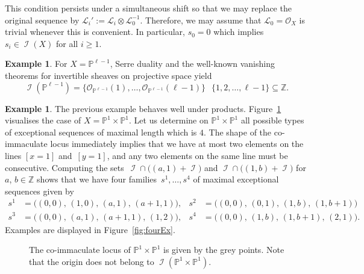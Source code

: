 \documentclass[11pt]{article}
\theoremstyle{definition}
\newtheorem{exam}[theo]{Example}
\numberwithin{equation}{section}
\newcommand{\PP}{\mathbb P}
\newcommand{\Z}{\mathbb Z}
\newcommand{\CI}{{\mathcal I}}
\newcommand{\CL}{{\mathcal L}}
\newcommand{\CO}{{\mathcal O}}
\newcommand{\entspr}{\mathop{\widehat{=}}}
\newcommand{\nImm}{\operatorname{\CI}}
\newcommand{\cl}{s}
\newcommand{\mes}{maximal exceptional sequence}
\begin{document}
This condition persists under a 
simultaneous shift so that we 
may replace the original sequence by 
$\CL_i':=\CL_i\otimes\CL_0^{-1}$. 
Therefore, we may assume that 
$\CL_0=\CO_X$ is trivial whenever this 
is convenient. In particular, $\cl_0=0$ 
which implies $\cl_i\in\nImm(X)$ for 
all $i\geq 1$.

\begin{exam}\label{ex:PnP1}
For $X=\PP^{\ell-1}$, Serre duality and 
the well-known vanishing theorems for 
invertible sheaves on projective space 
yield 
$$
\nImm(\PP^{\ell-1})=\{\CO_{\PP^{\ell-1}}(1),\ldots,
\CO_{\PP^{\ell-1}}(\ell-1)\}
\entspr\,\{1,2,\ldots,\ell-1\}\subseteq\Z.
$$
\end{exam}

\begin{exam}\label{ex:P1P1}
The previous example behaves well under 
products. Figure~\ref{fig:ImmP2P2} 
visualises the case of $X=\PP^1\times\PP^1$. 
Let us determine on $\PP^1\times\PP^1$ all 
possible types of exceptional sequences of 
maximal length which is $4$. The shape of 
the {co-immaculate} locus immediately implies 
that we have at most two elements on the 
lines $[x=1]$ and~$[y=1]$, and any two 
elements on the same line must be 
consecutive. Computing the sets~$\nImm\cap\big((a,1)+\nImm\big)$ and 
$\nImm\cap\big((1,b)+\nImm\big)$ for 
$a$, $b\in\Z$ shows that we have four 
families~$\cl^1,\ldots,\cl^4$ of {\mes}{s}
given by
$$
\begin{array}{llll}
\cl^1&=\big((0,0),\,(1,0),\,(a,1),\,(a+1,1)\big),&
\cl^2&=\big((0,0),\,(0,1),\,(1,b),\,(1,b+1)\big)\\[5pt]
\cl^3&=\big((0,0),\,(a,1),\,(a+1,1),\,(1,2)\big),&
\cl^4&=\big((0,0),\,(1,b),\,(1,b+1),\,(2,1)\big).
\end{array}
$$
Examples are displayed in Figure~\ref{fig:fourEx}.

\begin{figure}[ht]
\caption{The {co-immaculate} locus of
$\PP^1\times\PP^1$ is given by the 
grey points. Note that the origin 
does not belong to
$\nImm(\PP^1\times\PP^1)$.}
\label{fig:ImmP2P2}
\end{figure}
\end{exam}
\end{document}
